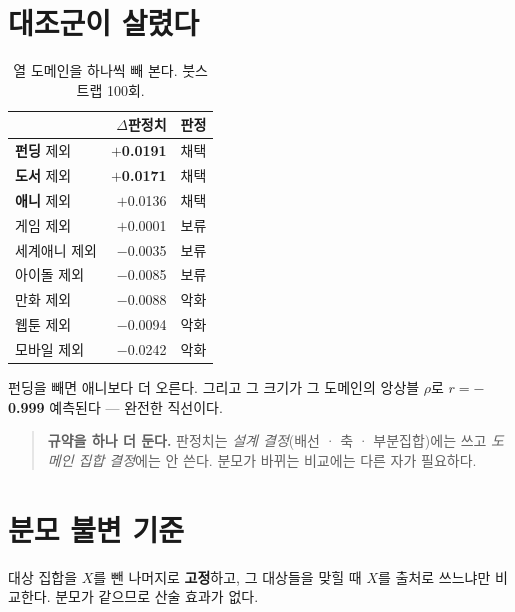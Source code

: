 \documentclass[10pt]{article}
\begin{document}
\section{대조군이 살렸다}

\begin{table}[t]
\centering\tsize
\caption{열 도메인을 하나씩 빼 본다. 붓스트랩 100회.}
\begin{tabular}{lrl}
\toprule
& $\Delta$판정치 & 판정 \\
\midrule
\textbf{펀딩} 제외 & \textbf{$+$0.0191} & 채택 \\
\textbf{도서} 제외 & \textbf{$+$0.0171} & 채택 \\
\textbf{애니} 제외 & $+$0.0136 & 채택 \\
게임 제외 & $+$0.0001 & 보류 \\
세계애니 제외 & $-$0.0035 & 보류 \\
아이돌 제외 & $-$0.0085 & 보류 \\
만화 제외 & $-$0.0088 & 악화 \\
웹툰 제외 & $-$0.0094 & 악화 \\
모바일 제외 & $-$0.0242 & 악화 \\
\bottomrule
\end{tabular}
\end{table}

펀딩을 빼면 애니보다 더 오른다. 그리고 그 크기가 그 도메인의 앙상블 $\rho$로
\textbf{$r=-$0.999} 예측된다 --- 완전한 직선이다.


\begin{quote}\fontsize{9.5}{11.5}\selectfont
\textbf{규약을 하나 더 둔다.} 판정치는 \emph{설계 결정}(배선 · 축 · 부분집합)에는
쓰고 \emph{도메인 집합 결정}에는 안 쓴다. 분모가 바뀌는 비교에는 다른 자가
필요하다.
\end{quote}

\section{분모 불변 기준}

대상 집합을 $X$를 뺀 나머지로 \textbf{고정}하고, 그 대상들을 맞힐 때 $X$를
출처로 쓰느냐만 비교한다. 분모가 같으므로 산술 효과가 없다.
\end{document}
